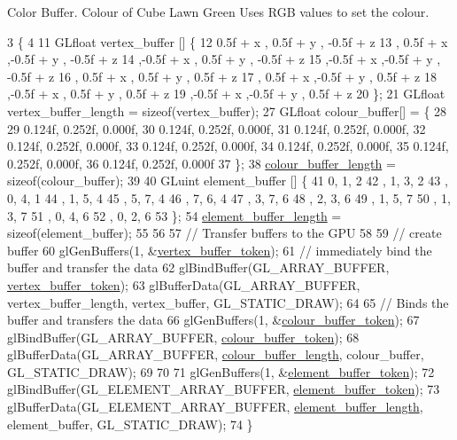 Color Buffer. Colour of Cube Lawn Green Uses R\+G\+B values to set the colour.
\begin{DoxyCode}
3                                                          \{
4   
11   GLfloat vertex\_buffer [] \{
12       0.5f + x  , 0.5f + y  , -0.5f + z
13     , 0.5f + x  ,-0.5f + y  , -0.5f + z
14     ,-0.5f + x  , 0.5f + y  , -0.5f + z
15     ,-0.5f + x  ,-0.5f + y  , -0.5f + z
16     , 0.5f + x  , 0.5f + y  ,  0.5f + z
17     , 0.5f + x  ,-0.5f + y  ,  0.5f + z
18     ,-0.5f + x  , 0.5f + y  ,  0.5f + z
19     ,-0.5f + x  ,-0.5f + y  ,  0.5f + z
20   \};
21   GLfloat vertex\_buffer\_length = \textcolor{keyword}{sizeof}(vertex\_buffer);
27   GLfloat colour\_buffer[] = \{
28 
29      0.124f, 0.252f, 0.000f,
30      0.124f, 0.252f, 0.000f,
31      0.124f, 0.252f, 0.000f,
32      0.124f, 0.252f, 0.000f,
33      0.124f, 0.252f, 0.000f,
34      0.124f, 0.252f, 0.000f,
35      0.124f, 0.252f, 0.000f,
36      0.124f, 0.252f, 0.000f
37   \};
38   \hyperlink{classGroundAsset_aa7808332316a2ba6f7fd0efd7ec5bdb2}{colour\_buffer\_length} = \textcolor{keyword}{sizeof}(colour\_buffer);
39   
40   GLuint element\_buffer []  \{
41       0, 1, 2   
42     , 1, 3, 2
43     , 0, 4, 1   
44     , 1, 5, 4   
45     , 5, 7, 4   
46     , 7, 6, 4   
47     , 3, 7, 6   
48     , 2, 3, 6   
49     , 1, 5, 7   
50     , 1, 3, 7   
51     , 0, 4, 6   
52     , 0, 2, 6   
53   \};
54   \hyperlink{classGroundAsset_a68cd956ec94f65cd5def56e3e442cd55}{element\_buffer\_length} = \textcolor{keyword}{sizeof}(element\_buffer);
55 
56 
57   \textcolor{comment}{// Transfer buffers to the GPU}
58 
59   \textcolor{comment}{// create buffer}
60   glGenBuffers(1, &\hyperlink{classGroundAsset_a32dbd8507aff2931228318f84160e493}{vertex\_buffer\_token});
61   \textcolor{comment}{// immediately bind the buffer and transfer the data}
62   glBindBuffer(GL\_ARRAY\_BUFFER, \hyperlink{classGroundAsset_a32dbd8507aff2931228318f84160e493}{vertex\_buffer\_token});
63   glBufferData(GL\_ARRAY\_BUFFER, vertex\_buffer\_length, vertex\_buffer, GL\_STATIC\_DRAW);
64 
65   \textcolor{comment}{// Binds the buffer and transfers the data}
66   glGenBuffers(1, &\hyperlink{classGroundAsset_acae5e4f08e295851822c3dbb3c10f2ee}{colour\_buffer\_token});
67   glBindBuffer(GL\_ARRAY\_BUFFER, \hyperlink{classGroundAsset_acae5e4f08e295851822c3dbb3c10f2ee}{colour\_buffer\_token});
68   glBufferData(GL\_ARRAY\_BUFFER, \hyperlink{classGroundAsset_aa7808332316a2ba6f7fd0efd7ec5bdb2}{colour\_buffer\_length}, colour\_buffer, GL\_STATIC\_DRAW);
69 
70 
71   glGenBuffers(1, &\hyperlink{classGroundAsset_af9612e4d7ba49cbacc2ee93266c2b89e}{element\_buffer\_token});
72   glBindBuffer(GL\_ELEMENT\_ARRAY\_BUFFER, \hyperlink{classGroundAsset_af9612e4d7ba49cbacc2ee93266c2b89e}{element\_buffer\_token});
73   glBufferData(GL\_ELEMENT\_ARRAY\_BUFFER, \hyperlink{classGroundAsset_a68cd956ec94f65cd5def56e3e442cd55}{element\_buffer\_length}, element\_buffer, 
      GL\_STATIC\_DRAW);
74 \}
\end{DoxyCode}
\hypertarget{classGroundAsset_a8f607f3cabded6280c5a5eb2cbfa8c79}{}
